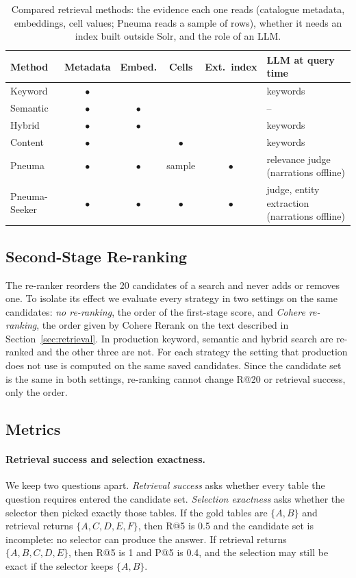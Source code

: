 \begin{table}[t]
\caption{Compared retrieval methods: the evidence each one reads (catalogue
metadata, embeddings, cell values; Pneuma reads a sample of rows), whether it
needs an index built outside Solr, and the role of an LLM.}
\label{tab:methods}
\centering
\footnotesize
\setlength{\tabcolsep}{3pt}
\begin{tabular}{lcccc p{3.0cm}}
\hline
Method & Metadata & Embed. & Cells & Ext.\ index & LLM at query time \\
\hline
Keyword & $\bullet$ & & & & keywords \\
Semantic & $\bullet$ & $\bullet$ & & & -- \\
Hybrid & $\bullet$ & $\bullet$ & & & keywords \\
Content & $\bullet$ & & $\bullet$ & & keywords \\
Pneuma & $\bullet$ & $\bullet$ & sample & $\bullet$ & relevance judge (narrations offline) \\
Pneuma-Seeker & $\bullet$ & $\bullet$ & $\bullet$ & $\bullet$ & judge, entity extraction (narrations offline) \\
\hline
\end{tabular}
\end{table}

\subsection{Second-Stage Re-ranking}
\label{sec:rerank-setup}

The re-ranker reorders the 20 candidates of a search and never adds or
removes one. To isolate its effect we evaluate every strategy in two
settings on the same candidates: \emph{no re-ranking}, the order of the
first-stage score, and \emph{Cohere re-ranking}, the order given by Cohere
Rerank on the text described in Section~\ref{sec:retrieval}. In production
keyword, semantic and hybrid search are re-ranked and the other three are not.
For each strategy the setting that production does not use is computed on the
same saved candidates. Since the candidate set is the same in both settings,
re-ranking cannot change R@20 or retrieval success, only the order.

\subsection{Metrics}
\label{sec:metrics}

\paragraph{Retrieval success and selection exactness.}
We keep two questions apart. \emph{Retrieval success} asks whether every
table the question requires entered the candidate set. \emph{Selection
exactness} asks whether the selector then picked exactly those tables. If the
gold tables are $\{A,B\}$ and retrieval returns $\{A,C,D,E,F\}$, then R@5 is
0.5 and the candidate set is incomplete: no selector can produce the answer. If
retrieval returns $\{A,B,C,D,E\}$, then R@5 is 1 and P@5 is 0.4, and the
selection may still be exact if the selector keeps $\{A,B\}$.

